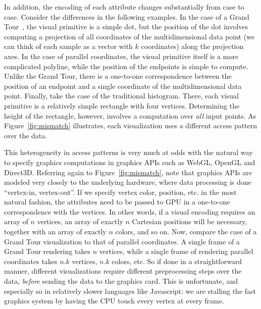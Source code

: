 In addition, the encoding of each attribute changes substantially from case to case. Consider the differences in the following examples.
In the case of a Grand Tour~\cite{Asimov:1985:TGT}, the visual primitive is a simple dot, but the position of the dot involves computing a projection of all coordinates of the multidimensional data point (we can think of each sample as a vector with $k$ coordinates) along the projection axes. 
In the case of parallel coordinates, the visual primitive itself is a more complicated polyline, while the position of the endpoints is simple to compute. 
Unlike the Grand Tour, there is a one-to-one correspondence between the position of an endpoint and a single coordinate of the multidimensional data point.
Finally, take the case of the traditional histogram. 
There, each visual primitive is a relatively simple rectangle with four vertices. 
Determining the height of the rectangle, however, involves a computation over \emph{all} input points. 
As Figure~\ref{fig:mismatch} illustrates, each visualization uses a different access pattern over the data.

This heterogeneity in access patterns is very much at odds with the natural way to specify graphics computations in graphics APIs such as WebGL, OpenGL and Direct3D. 
Referring again to Figure~\ref{fig:mismatch}, note that graphics APIs are modeled very closely to the underlying hardware, where data processing is done ``vertex-in, vertex-out''. 
If we specify vertex color, position, etc. in the most natural fashion, the attributes need to be passed to GPU in a one-to-one correspondence with the vertices. 
In other words, if a visual encoding requires an array of $n$ vertices, an array of exactly $n$ Cartesian positions will be necessary, together with an array of exactly $n$ colors, and so on. 
Now, compare the case of a Grand Tour visualization to that of parallel coordinates. 
A single frame of a Grand Tour rendering takes $n$ vertices, while a single frame of rendering parallel coordinates takes $n.k$ vertices, $n.k$ colors, etc. 
So if done in a straightforward manner, different visualizations require different preprocessing steps over the data, \emph{before} sending the data to the graphics card. 
This is unfortunate, and especially so in relatively slower languages like Javascript: we are stalling the fast graphics system by having the CPU touch every vertex at every frame.

